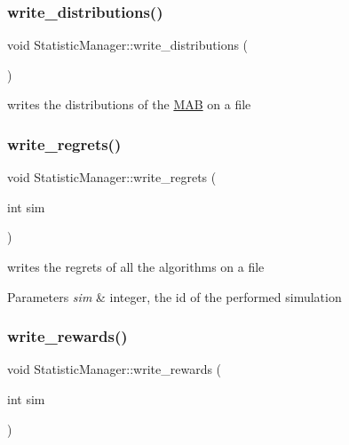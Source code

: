 \subsubsection{\texorpdfstring{write\+\_\+distributions()}{write\_distributions()}}
{\footnotesize\ttfamily void Statistic\+Manager\+::write\+\_\+distributions (\begin{DoxyParamCaption}{ }\end{DoxyParamCaption})}



writes the distributions of the \mbox{\hyperlink{class_m_a_b}{M\+AB}} on a file 

\mbox{\label{class_statistic_manager_a860a072febcdfa51da4552982afa3353}} 
\subsubsection{\texorpdfstring{write\+\_\+regrets()}{write\_regrets()}}
{\footnotesize\ttfamily void Statistic\+Manager\+::write\+\_\+regrets (\begin{DoxyParamCaption}\item[{int}]{sim }\end{DoxyParamCaption})}



writes the regrets of all the algorithms on a file 


\begin{DoxyParams}{Parameters}
{\em sim} & integer, the id of the performed simulation \\
\hline
\end{DoxyParams}
\mbox{\label{class_statistic_manager_afd9de41c65c706e3bec9bf0b76000f27}} 
\subsubsection{\texorpdfstring{write\+\_\+rewards()}{write\_rewards()}}
{\footnotesize\ttfamily void Statistic\+Manager\+::write\+\_\+rewards (\begin{DoxyParamCaption}\item[{int}]{sim }\end{DoxyParamCaption})}



